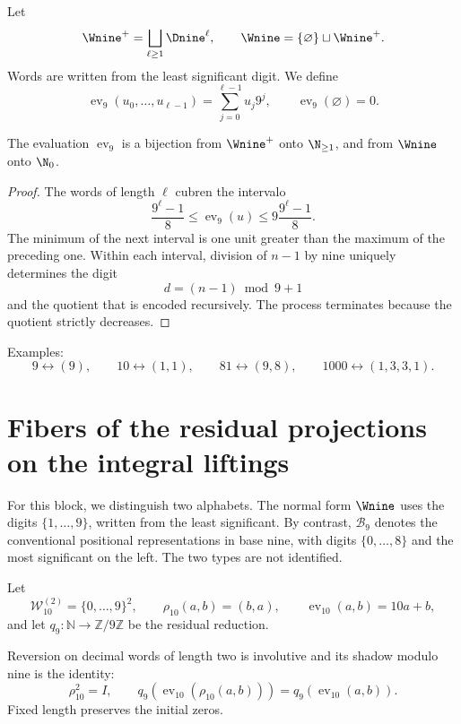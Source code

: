 \begin{definition}
Let
\[
 \Wnine^+=\bigsqcup_{\ell\geq1}\Dnine^\ell,
 \qquad \Wnine=\{\varnothing\}\sqcup\Wnine^+.
\]
Words are written from the least significant digit. We define
\[
 \operatorname{ev}_9(u_0,\ldots,u_{\ell-1})
 =\sum_{j=0}^{\ell-1}u_j9^j,
 \qquad \operatorname{ev}_9(\varnothing)=0.
\]
\end{definition}

\begin{theorem}
The evaluation $\operatorname{ev}_9$ is a bijection from $\Wnine^+$ onto
$\N_{\geq1}$, and from $\Wnine$ onto $\N_0$.
\end{theorem}

\begin{proof}
The words of length $\ell$ cubren the intervalo
\[
 \frac{9^\ell-1}{8}
 \leq \operatorname{ev}_9(u)
 \leq 9\frac{9^\ell-1}{8}.
\]
The minimum of the next interval is one unit greater than the maximum of the
preceding one. Within each interval, division of $n-1$ by nine uniquely determines
the digit
\[
 d=(n-1)\bmod9+1
\]
and the quotient that is encoded recursively. The process terminates because the
quotient strictly decreases.
\end{proof}

Examples:
\[
 9\longleftrightarrow(9),\qquad
 10\longleftrightarrow(1,1),\qquad
 81\longleftrightarrow(9,8),\qquad
 1000\longleftrightarrow(1,3,3,1).
\]

\section{Fibers of the residual projections on the integral liftings}

For this block, we distinguish two alphabets. The normal form
\(\Wnine\) uses the digits \(\{1,\ldots,9\}\), written from the least
significant. By contrast, \(\mathscr B_9\) denotes the conventional positional
representations in base nine, with digits \(\{0,\ldots,8\}\) and the most
significant on the left. The two types are not identified.

Let
\[
 \mathscr W_{10}^{(2)}=\{0,\ldots,9\}^2,\qquad
 \rho_{10}(a,b)=(b,a),\qquad
 \operatorname{ev}_{10}(a,b)=10a+b,
\]
and let \(q_9:\mathbb N\to\mathbb Z/9\mathbb Z\) be the residual reduction.

\begin{lemma}
\label{int:pf84:SYN30-RHO-DESC}
Reversion on decimal words of length two is involutive and its
shadow modulo nine is the identity:
\[
 \rho_{10}^2=I,\qquad
 q_9\!\left(\operatorname{ev}_{10}(\rho_{10}(a,b))\right)
 =
 q_9\!\left(\operatorname{ev}_{10}(a,b)\right).
\]
Fixed length preserves the initial zeros.
\end{lemma}

